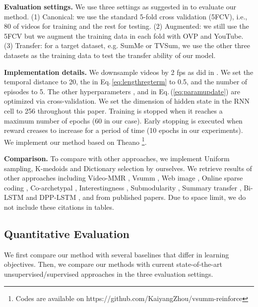 \documentclass[letterpaper]{article} \usepackage{aaai18}  \usepackage{times}  \usepackage{helvet}  \usepackage{courier}  \usepackage{url}  \usepackage{graphicx}
\begin{document}
{\bf Evaluation settings.} We use three settings as suggested in \cite{zhang2016video} to evaluate our method. (1) Canonical: we use the standard 5-fold cross validation (5FCV), i.e., 80 of videos for training and the rest for testing. (2) Augmented: we still use the 5FCV but we augment the training data in each fold with OVP and YouTube. (3) Transfer: for a target dataset, e.g. SumMe or TVSum, we use the other three datasets as the training data to test the transfer ability of our model. 

{\bf Implementation details.} We downsample videos by 2 fps as did in \cite{zhang2016video}. We set the temporal distance  to 20, the  in Eq.\,\ref{eq:lengthregterm} to 0.5, and the number of episodes  to 5. The other hyperparameters ,  and  in Eq.\,(\ref{eq:paramupdate}) are optimized via cross-validation. We set the dimension of hidden state in the RNN cell to 256 throughout this paper. Training is stopped when it reaches a maximum number of epochs (60 in our case). Early stopping is executed when reward creases to increase for a period of time (10 epochs in our experiments). We implement our method based on Theano \cite{al2016theano}\footnote{Codes are available on https://github.com/KaiyangZhou/vsumm-reinforce}.

{\bf Comparison.} To compare with other approaches, we implement Uniform sampling, K-medoids and Dictionary selection \cite{elhamifar2012see} by ourselves. We retrieve results of other approaches including Video-MMR \cite{li2010multi}, Vsumm \cite{de2011vsumm}, Web image \cite{khosla2013large}, Online sparse coding \cite{zhao2014quasi}, Co-archetypal \cite{song2015tvsum}, Interestingness \cite{gygli2014creating}, Submodularity \cite{gygli2015video}, Summary transfer \cite{zhang2016summary}, Bi-LSTM and DPP-LSTM \cite{zhang2016video},  and  \cite{mahasseniunsupervised} from published papers. Due to space limit, we do not include these citations in tables.

\subsection{Quantitative Evaluation}
We first compare our method with several baselines that differ in learning objectives. Then, we compare our methods with current state-of-the-art unsupervised/supervised approaches in the three evaluation settings.
\end{document}
